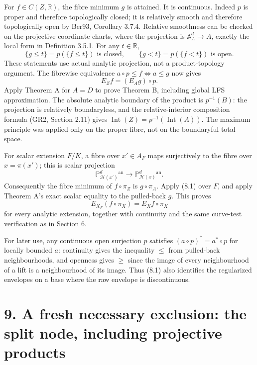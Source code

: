 \documentclass[11pt]{article}
\begin{document}
For \(f\in C(Z,\mathbb R)\), the fibre minimum \(g\) is attained. It is continuous. Indeed \(p\) is proper and therefore topologically closed; it is relatively smooth and therefore topologically open by Ber93, Corollary 3.7.4. Relative smoothness can be checked on the projective coordinate charts, where the projection is \(\mathbb A^d_A\to A\), exactly the local form in Definition 3.5.1. For any \(t\in\mathbb R\),
\[
\{g\leq t\}=p(\{f\leq t\})\text{ is closed},\qquad
\{g<t\}=p(\{f<t\})\text{ is open}.
\]
These statements use actual analytic projection, not a product-topology argument. The fibrewise equivalence \(a\circ p\leq f\Longleftrightarrow a\leq g\) now gives
\[
E_Zf=(E_Ag)\circ p.
\tag{8.1}
\]
Apply Theorem A for \(A=D\) to prove Theorem B, including global LFS approximation. The absolute analytic boundary of the product is \(p^{-1}(B)\): the projection is relatively boundaryless, and the relative-interior composition formula (GR2, Section 2.11) gives \(\operatorname{Int}(Z)=p^{-1}(\operatorname{Int}(A))\). The maximum principle was applied only on the proper fibre, not on the boundaryful total space.

For scalar extension \(F/K\), a fibre over \(x'\in A_F\) maps surjectively to the fibre over \(x=\pi(x')\); this is scalar projection
\[
\mathbb P^d_{\mathcal H(x')}{}^{\mathrm{an}}
\longrightarrow \mathbb P^d_{\mathcal H(x)}{}^{\mathrm{an}}.
\]
Consequently the fibre minimum of \(f\circ\pi_Z\) is \(g\circ\pi_A\). Apply (8.1) over \(F\), and apply Theorem A's exact scalar equality to the pulled-back \(g\). This proves
\[
E_{X_F}(f\circ\pi_X)=E_Xf\circ\pi_X
\]
for every analytic extension, together with continuity and the same curve-test verification as in Section 6.

For later use, any continuous open surjection \(p\) satisfies \((a\circ p)^*=a^*\circ p\) for locally bounded \(a\): continuity gives the inequality \(\leq\) from pulled-back neighbourhoods, and openness gives \(\geq\) since the image of every neighbourhood of a lift is a neighbourhood of its image. Thus (8.1) also identifies the regularized envelopes on a base where the raw envelope is discontinuous.

\section*{9. A fresh necessary exclusion: the split node, including projective products}
\end{document}
